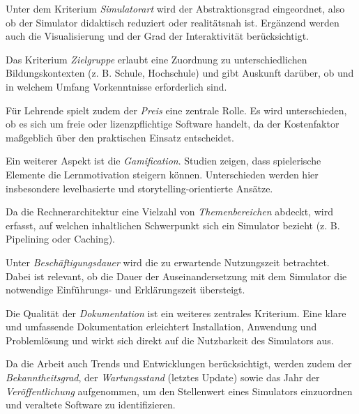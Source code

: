 Unter dem Kriterium \textit{Simulatorart} wird der Abstraktionsgrad eingeordnet, also ob der Simulator didaktisch reduziert oder realitätsnah ist. Ergänzend werden auch die Visualisierung und der Grad der Interaktivität berücksichtigt.

Das Kriterium \textit{Zielgruppe} erlaubt eine Zuordnung zu unterschiedlichen Bildungskontexten (z. B. Schule, Hochschule) und gibt Auskunft darüber, ob und in welchem Umfang Vorkenntnisse erforderlich sind.

Für Lehrende spielt zudem der \textit{Preis} eine zentrale Rolle. Es wird unterschieden, ob es sich um freie oder lizenzpflichtige Software handelt, da der Kostenfaktor maßgeblich über den praktischen Einsatz entscheidet.

Ein weiterer Aspekt ist die \textit{Gamification}. Studien zeigen, dass spielerische Elemente die Lernmotivation steigern können. Unterschieden werden hier insbesondere levelbasierte und storytelling-orientierte Ansätze.\parencite[S. 106f]{sailer_gamification_2020}\parencite[S. 13]{baah_enhancing_2024}

Da die Rechnerarchitektur eine Vielzahl von \textit{Themenbereichen} abdeckt, wird erfasst, auf welchen inhaltlichen Schwerpunkt sich ein Simulator bezieht (z. B. Pipelining oder Caching).

Unter \textit{Beschäftigungsdauer} wird die zu erwartende Nutzungszeit betrachtet. Dabei ist relevant, ob die Dauer der Auseinandersetzung mit dem Simulator die notwendige Einführungs- und Erklärungszeit übersteigt.

Die Qualität der \textit{Dokumentation} ist ein weiteres zentrales Kriterium. Eine klare und umfassende Dokumentation erleichtert Installation, Anwendung und Problemlösung und wirkt sich direkt auf die Nutzbarkeit des Simulators aus.

Da die Arbeit auch Trends und Entwicklungen berücksichtigt, werden zudem der \textit{Bekanntheitsgrad}, der \textit{Wartungsstand} (letztes Update) sowie das Jahr der \textit{Veröffentlichung} aufgenommen, um den Stellenwert eines Simulators einzuordnen und veraltete Software zu identifizieren.

